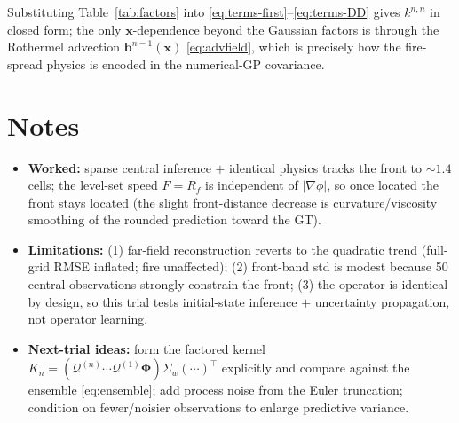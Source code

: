 \documentclass[11pt]{article}
\newcommand{\bx}{\mathbf{x}}
\newcommand{\bb}{\mathbf{b}}
\newcommand{\Qop}{\mathcal{Q}}
\begin{document}
Substituting Table~\ref{tab:factors} into
\eqref{eq:terms-first}--\eqref{eq:terms-DD} gives $k^{n,n}$ in closed form; the only
$\bx$-dependence beyond the Gaussian factors is through the Rothermel advection
$\bb^{n-1}(\bx)$ \eqref{eq:advfield}, which is precisely how the fire-spread physics
is encoded in the numerical-GP covariance.

\section{Notes}

\begin{itemize}\itemsep0pt
  \item \textbf{Worked:} sparse central inference $+$ identical physics tracks the
        front to $\sim1.4$ cells; the level-set speed $F=R_f$ is independent of
        $\lvert\nabla\phi\rvert$, so once located the front stays located (the
        slight front-distance decrease is curvature/viscosity smoothing of the
        rounded prediction toward the GT).
  \item \textbf{Limitations:} (1) far-field reconstruction reverts to the quadratic
        trend (full-grid RMSE inflated; fire unaffected); (2) front-band std is
        modest because 50 central observations strongly constrain the front; (3) the
        operator is identical by design, so this trial tests initial-state inference
        $+$ uncertainty propagation, not operator learning.
  \item \textbf{Next-trial ideas:} form the factored kernel
        $K_n=(\Qop^{(n)}\!\cdots\Qop^{(1)}\bm\Phi)\Sigma_w(\cdots)^{\!\top}$
        explicitly and compare against the ensemble \eqref{eq:ensemble}; add process
        noise from the Euler truncation; condition on fewer/noisier observations to
        enlarge predictive variance.
\end{itemize}
\end{document}
